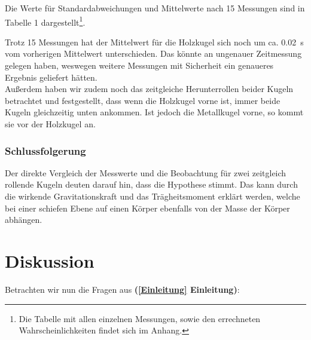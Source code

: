 \documentclass[11pt,a4paper,titlepage, ngerman]{article}
\begin{document}
				Die Werte für Standardabweichungen und Mittelwerte nach 15 Messungen sind in Tabelle 1 dargestellt\footnote{Die Tabelle mit allen einzelnen Messungen, sowie den errechneten Wahrscheinlichkeiten findet sich im Anhang.}.
				
				\newpage
								
				Trotz 15 Messungen hat der Mittelwert für die Holzkugel sich noch um ca. \SI{0.02}{s} vom vorherigen Mittelwert unterschieden. Das könnte an ungenauer Zeitmessung gelegen haben, weswegen weitere Messungen mit Sicherheit ein genaueres Ergebnis geliefert hätten. \\

				Außerdem haben wir zudem noch das zeitgleiche Herunterrollen beider Kugeln betrachtet und festgestellt, dass wenn die Holzkugel vorne ist, immer beide Kugeln gleichzeitig unten ankommen. Ist jedoch die Metallkugel vorne, so kommt sie vor der Holzkugel an.	
				
			\subsubsection{Schlussfolgerung}
				\label{2.3.3}
				
				Der direkte Vergleich der Messwerte und die Beobachtung für zwei zeitgleich rollende Kugeln deuten darauf hin, dass die Hypothese stimmt.
				Das kann durch die wirkende Gravitationskraft und das Trägheitsmoment erklärt werden, welche bei einer schiefen Ebene auf einen Körper ebenfalls von der Masse der Körper abhängen.
				
	\newpage
	\section{Diskussion}	
		\label{Diskussion}
		
		Betrachten wir nun die Fragen aus \textbf{(\ref{Einleitung} Einleitung)}: \\
		
\end{document}
